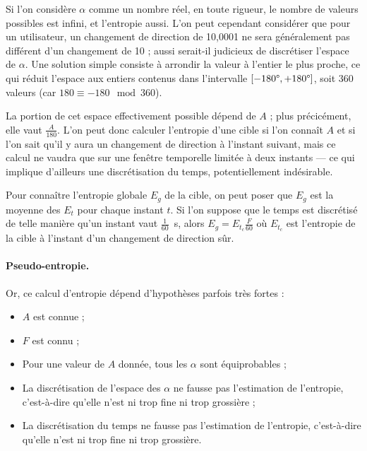 	Si l'on considère $\alpha$ comme un nombre réel, en toute rigueur, le nombre de valeurs possibles est infini, et l'entropie aussi. L'on peut cependant considérer que pour un utilisateur, un changement de direction de 10,0001\textdegree{} ne sera généralement pas différent d'un changement de 10\textdegree{} ; aussi serait-il judicieux de discrétiser l'espace de $\alpha$. Une solution simple consiste à arrondir la valeur à l'entier le plus proche, ce qui réduit l'espace aux entiers contenus dans l'intervalle $[-180\degree{}, +180\degree{}]$, soit 360 valeurs (car $180 \equiv -180 \mod 360$).
	
	La portion de cet espace effectivement possible dépend de $A$ ; plus précicément, elle vaut $\frac{A}{180}$. L'on peut donc calculer l'entropie d'une cible si l'on connaît $A$ et si l'on sait qu'il y aura un changement de direction à l'instant suivant, mais ce calcul ne vaudra que sur une fenêtre temporelle limitée à deux \og instants \fg{} --- ce qui implique d'ailleurs une discrétisation du temps, potentiellement indésirable.
	
	Pour connaître l'entropie globale $E_{g}$ de la cible, on peut poser que $E_{g}$ est la moyenne des $E_{t}$ pour chaque instant $t$. Si l'on suppose que le temps est discrétisé de telle manière qu'un instant vaut $\frac{1}{60}$~s, alors $E_{g} = E_{t_{c}} \frac{F}{60}$ où $E_{t_{c}}$ est l'entropie de la cible à l'instant d'un changement de direction sûr.
	
	\paragraph{Pseudo-entropie.}
	Or, ce calcul d'entropie dépend d'hypothèses parfois très fortes :
	
	\begin{itemize}
		\item $A$ est connue ;
		\item $F$ est connu ;
		\item Pour une valeur de $A$ donnée, tous les $\alpha$ sont équiprobables ;
		\item La discrétisation de l'espace des $\alpha$ ne fausse pas l'estimation de l'entropie, c'est-à-dire qu'elle n'est ni trop fine ni trop grossière ;
		\item La discrétisation du temps ne fausse pas l'estimation de l'entropie, c'est-à-dire qu'elle n'est ni trop fine ni trop grossière.
	\end{itemize}
	
